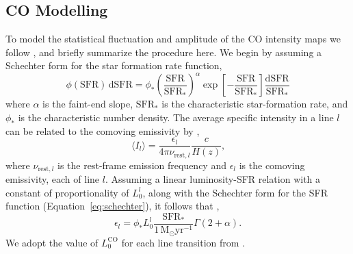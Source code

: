 \documentclass{aastex62}
\newcommand{\Msun}{\ensuremath{\text{M}_\odot}}
\newcommand{\SFR}{\ensuremath{\text{SFR}}}
\newcommand{\CO}{\ensuremath{\text{CO}}}
\newcommand{\beq}{\begin{equation}}
\newcommand{\eeq}{\end{equation}}
\newcommand{\avg}[1]{\ensuremath{\langle #1 \rangle}}
\begin{document}
\subsection{CO Modelling} \label{ssec:co_modelling}
To model the statistical fluctuation and amplitude of the \CO{} intensity maps
we follow \citet{2016ApJ...825..143L}, and briefly summarize the procedure
here. We begin by assuming a Schechter form for the star formation rate
function,
\beq\label{eq:schechter}
\phi(\SFR)\,\text{d}\SFR = \phi_*
\left(\frac{\SFR}{\SFR_*}\right)^{\alpha}\exp{\left[-\frac{\SFR}{\SFR_*}\right]}
\frac{\text{d}\SFR}{\SFR_*}
\eeq
where $\alpha$ is the faint-end slope, $\SFR_*$ is the characteristic
star-formation rate, and $\phi_*$ is the characteristic number density. The
average specific intensity in a line $l$ can be related to the comoving
emissivity by \citep{2011ApJ...741...70L, 2013ApJ...768...15P},
\beq\label{eq:emiss_to_int}
\avg{I_l} = \frac{\epsilon_l}{4\pi \nu_{\text{rest},l}}\frac{c}{H(z)}\text{,}
\eeq
where $\nu_{\text{rest},l}$ is the rest-frame emission frequency and
$\epsilon_l$ is the comoving emissivity, each of line $l$. Assuming a linear
luminosity-SFR relation with a constant of proportionality of $L_0^l$, along
with the Schechter form for the SFR function (Equation~\ref{eq:schechter}), it
follows that \citep{2013ApJ...768...15P},
\beq\label{eq:com_emiss}
\epsilon_l = \phi_* L_0^{l}
\frac{\SFR_*}{1\,\Msun\text{yr}^{-1}}\Gamma{(2+\alpha)}\text{.}
\eeq
We adopt the value of $L_0^{\CO}$ for each line transition from
\citet{2010JCAP...11..016V}.
\end{document}

